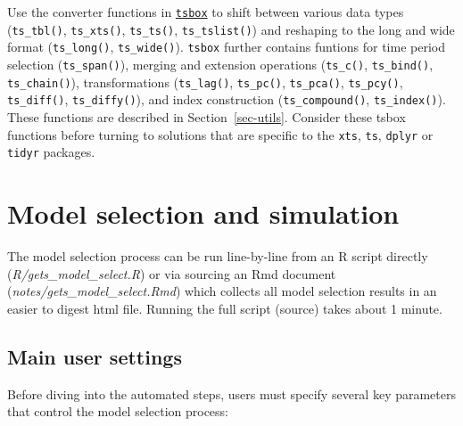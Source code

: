 \documentclass[
  letterpaper,
  DIV=11,
  numbers=noendperiod]{scrreport}
\begin{document}
Use the converter functions in
\href{https://www.tsbox.help/reference/index.html}{\texttt{tsbox}} to
shift between various data types (\texttt{ts\_tbl()},
\texttt{ts\_xts()}, \texttt{ts\_ts()}, \texttt{ts\_tslist()}) and
reshaping to the long and wide format (\texttt{ts\_long()},
\texttt{ts\_wide()}). \texttt{tsbox} further contains funtions for time
period selection (\texttt{ts\_span()}), merging and extension operations
(\texttt{ts\_c()}, \texttt{ts\_bind()}, \texttt{ts\_chain()}),
transformations (\texttt{ts\_lag()}, \texttt{ts\_pc()},
\texttt{ts\_pca()}, \texttt{ts\_pcy()}, \texttt{ts\_diff()},
\texttt{ts\_diffy()}), and index construction (\texttt{ts\_compound()},
\texttt{ts\_index()}). These functions are described in
Section~\ref{sec-utils}. Consider these tsbox functions before turning
to solutions that are specific to the \texttt{xts}, \texttt{ts},
\texttt{dplyr} or \texttt{tidyr} packages.


\chapter{Model selection and simulation}\label{sec-modselect}

The model selection process can be run line-by-line from an R script
directly (\emph{R/gets\_model\_select.R}) or via sourcing an Rmd
document (\emph{notes/gets\_model\_select.Rmd}) which collects all model
selection results in an easier to digest html file. Running the full
script (source) takes about 1 minute.

\section{Main user settings}\label{main-user-settings}

Before diving into the automated steps, users must specify several key
parameters that control the model selection process:
\end{document}
